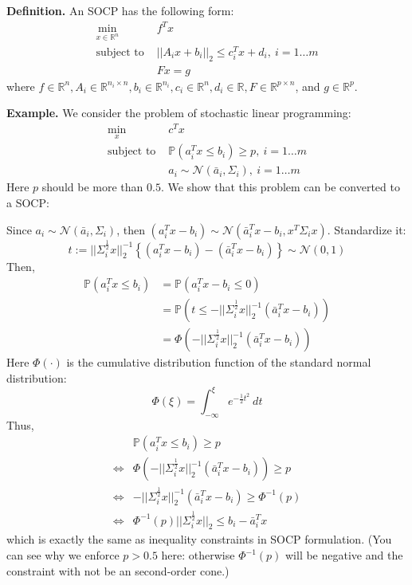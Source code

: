 \documentclass[
]{book}
\theoremstyle{definition}
\theoremstyle{definition}
\theoremstyle{definition}
\theoremstyle{definition}
\theoremstyle{remark}
\begin{document}
\textbf{Definition.} An SOCP has the following form:
\begin{align}
   \label{eq:app-socpdef}
   \min_{x \in \mathbb{R}^n} \ & f^T x \\
   \text{subject to } & || A_i x + b_i ||_2 \le c_i^T x + d_i, \ i = 1 \dots m \\
   & Fx = g
\end{align}
where \(f \in \mathbb{R}^n, A_i \in \mathbb{R}^{n_i \times n}, b_i \in \mathbb{R}^{n_i}, c_i \in \mathbb{R}^n, d_i \in \mathbb{R}, F \in \mathbb{R}^{p \times n}\), and \(g \in \mathbb{R}^p\).

\textbf{Example.} We consider the problem of stochastic linear programming:
\begin{align}
   \min_x \ & c^T x \\
   \text{subject to } & \mathbb{P}(a_i^T x \le b_i) \ge p, \ i = 1 \dots m \\
   & a_i \sim \mathcal{N}(\bar{a}_i, \Sigma_i), \ i = 1 \dots m
\end{align}
Here \(p\) should be more than \(0.5\). We show that this problem can be converted to a SOCP:

Since \(a_i \sim \mathcal{N}(\bar{a}_i, \Sigma_i)\), then \((a_i^T x - b_i) \sim \mathcal{N}(\bar{a}_i^T x - b_i, x^T \Sigma_i x)\). Standardize it:
\begin{equation*}
   t := ||\Sigma_i^{\frac{1}{2}} x||_2^{-1} \left\{ (a_i^T x - b_i) - (\bar{a}_i^T x - b_i) \right\} \sim \mathcal{N}(0, 1)
\end{equation*}
Then,
\begin{align}
   \mathbb{P}(a_i^T x \le b_i) & = \mathbb{P}(a_i^T x - b_i \le 0) \\
   & = \mathbb{P}(t \le -||\Sigma_i^{\frac{1}{2}} x||_2^{-1}(\bar{a}_i^T x - b_i)) \\
   & = \Phi(-||\Sigma_i^{\frac{1}{2}} x||_2^{-1}(\bar{a}_i^T x - b_i))
\end{align}
Here \(\Phi(\cdot)\) is the cumulative distribution function of the standard normal distribution:
\begin{equation*}
   \Phi(\xi) = \int_{-\infty}^{\xi} e^{-\frac{1}{2} t^2} \ dt
\end{equation*}
Thus,
\begin{align}
   & \mathbb{P}(a_i^T x \le b_i) \ge p \\
   \Longleftrightarrow & \Phi(-||\Sigma_i^{\frac{1}{2}} x||_2^{-1}(\bar{a}_i^T x - b_i)) \ge p \\
   \Longleftrightarrow & -||\Sigma_i^{\frac{1}{2}} x||_2^{-1}(\bar{a}_i^T x - b_i) \ge \Phi^{-1}(p) \\
   \Longleftrightarrow & \Phi^{-1}(p) ||\Sigma_i^{\frac{1}{2}} x||_2 \le b_i - \bar{a}_i^T x
\end{align}
which is exactly the same as inequality constraints in SOCP formulation. (You can see why we enforce \(p > 0.5\) here: otherwise \(\Phi^{-1}(p)\) will be negative and the constraint with not be an second-order cone.)
\end{document}
